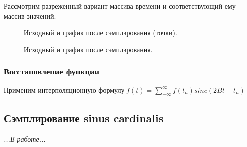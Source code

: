 \documentclass[a5paper, 10pt]{article}
\theoremstyle{definition}
\theoremstyle{plain}
\theoremstyle{remark}
\begin{document}
Рассмотрим разреженный вариант массива времени и соответствующий ему массив значений.
\begin{figure}[h!]
\caption{Исходный и график после сэмплирования (точки).}
\caption{Исходный и график после сэмплирования.}
\end{figure}

\subsubsection{Восстановление функции}
Применим интерполяционную формулу $f(t) = \sum \limits_{-\infty}^{\infty} f \left( t_n \right) sinc \left(2Bt - t_n \right)$


\subsection{Сэмплирование sinus cardinalis}
\textit{...В работе...}
\end{document}
